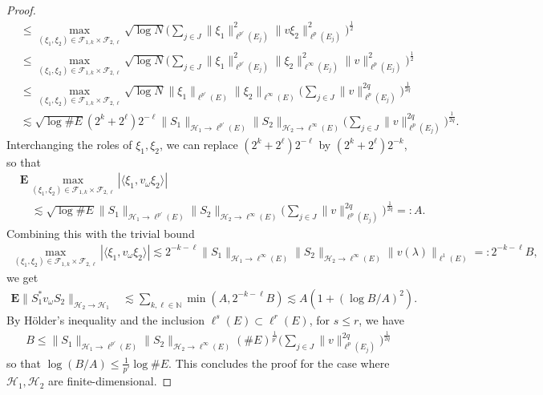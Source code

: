 \documentclass[12pt,reqno]{amsart}
\theoremstyle{definition}
\theoremstyle{remark}
\numberwithin{equation}{section}
\newcommand{\1}{\mathbbm{1}}
\newcommand{\N}{\mathbb{N}}
\begin{document}
\begin{proof}
\begin{align*}
  & \leq \max_{(\xi_1,\xi_2)\in \mathcal{F}_{1,k}\times \mathcal{F}_{2,\ell}} \sqrt{\log N}\Big(\sum_{j\in J}\| \xi_1\|_{\ell^{p'}(E_j)}^2\|v\xi_2\|_{\ell^{p}(E_j)}^2\Big)^{\frac{1}{2}} \\
  & \leq \max_{(\xi_1,\xi_2)\in \mathcal{F}_{1,k}\times \mathcal{F}_{2,\ell}} \sqrt{\log N}\Big(\sum_{j\in J}\| \xi_1\|_{\ell^{p'}(E_j)}^2\|\xi_2\|_{\ell^{\infty}(E_j)}^2\|v\|_{\ell^{p}(E_j)}^2\Big)^{\frac{1}{2}} \\
  & \leq \max_{(\xi_1,\xi_2)\in \mathcal{F}_{1,k}\times \mathcal{F}_{2,\ell}} \sqrt{\log N}\|\xi_1\|_{\ell^{p'}(E)}\|\xi_2\|_{\ell^{\infty}(E)}\Big(\sum_{j\in J}\|v\|_{\ell^{p}(E_j)}^{2q}\Big)^{\frac{1}{2q}} \\
  & \lesssim \sqrt{\log \# E}(2^k+2^{\ell})2^{-\ell}\|S_1\|_{\mathcal{H}_1\to \ell^{p'}(E)}\|S_2\|_{\mathcal{H}_2\to \ell^{\infty}(E)}\Big(\sum_{j\in J}\|v\|_{\ell^p(E_j)}^{2q}\Big)^{\frac{1}{2q}}.
\end{align*}
Interchanging the roles of $\xi_1,\xi_2$, we can replace $(2^k+2^{\ell})2^{-\ell}$ by $(2^k+2^{\ell})2^{-k}$, so that 
\begin{align*}
  & \mathbf{E}\max_{(\xi_1,\xi_2)\in \mathcal{F}_{1,k}\times \mathcal{F}_{2,\ell}}| \langle\xi_1,v_{\omega}\xi_2\rangle| \\
  & \quad \lesssim \sqrt{\log \# E}\|S_1\|_{\mathcal{H}_1\to \ell^{p'}(E)}\|S_2\|_{\mathcal{H}_2\to \ell^{\infty}(E)}\Big(\sum_{j\in J}\|v\|_{\ell^p(E_j)}^{2q}\Big)^{\frac{1}{2q}} =: A.
\end{align*}
Combining this with the trivial bound
\begin{align*}
\max_{(\xi_1,\xi_2)\in \mathcal{F}_{1,k}\times \mathcal{F}_{2,\ell}}|\langle\xi_1,v_{\omega}\xi_2\rangle|\lesssim 2^{-k-\ell}\|S_1\|_{\mathcal{H}_1\to \ell^{\infty}(E)}\|S_2\|_{\mathcal{H}_2\to \ell^{\infty}(E)}\|v(\lambda)\|_{\ell^1(E)}=:2^{-k-\ell}B,
\end{align*}
we get
\begin{align*}
\mathbf{E}\|S_1^*v_{\omega}S_2\|_{\mathcal{H}_2\to \mathcal{H}_1}
&\lesssim \sum_{k,\ell\in \N}\min(A,2^{-k-\ell}B)
\lesssim A(1+(\log B/A)^2).
\end{align*}
By H\"older's inequality and the inclusion $\ell^{s}(E)\subset\ell^{r}(E)$, for $s\leq r$, we have  
\begin{align*}
  B
  \leq \|S_1\|_{\mathcal{H}_1\to \ell^{p'}(E)}\|S_2\|_{\mathcal{H}_2\to \ell^{\infty}(E)}
  (\# E)^{\frac{1}{p'}}\Big(\sum_{j\in J}\|v\|_{\ell^p(E_j)}^{2q}\Big)^{\frac{1}{2q}}
\end{align*}
so that $\log(B/A)\leq \frac{1}{p'}\log\#E$.
This concludes the proof for the case where $\mathcal{H}_1,\mathcal{H}_2$ are finite-dimensional. 



\end{proof}
\end{document}
